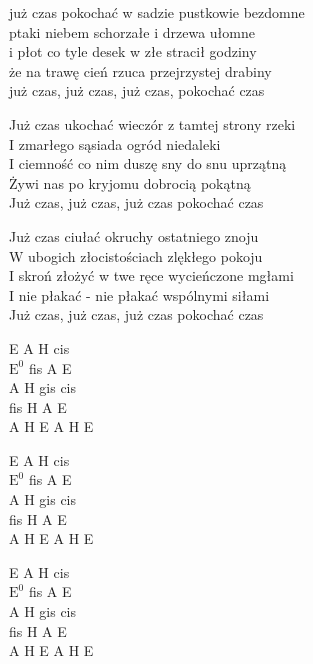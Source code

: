 \begin{textn}
    już czas pokochać w sadzie pustkowie bezdomne\\
    ptaki niebem schorzałe i drzewa ułomne\\
    i płot co tyle desek w złe stracił godziny\\
    że na trawę cień rzuca przejrzystej drabiny\\
    już czas, już czas, już czas, pokochać czas

    Już czas ukochać wieczór z tamtej strony rzeki\\
    I zmarłego sąsiada ogród niedaleki\\
    I ciemność co nim duszę sny do snu uprzątną\\
    Żywi nas po kryjomu dobrocią pokątną\\
    Już czas, już czas, już czas pokochać czas

    Już czas ciułać okruchy ostatniego znoju\\
    W ubogich złocistościach zlękłego pokoju\\
    I skroń złożyć w twe ręce wycieńczone mgłami\\
    I nie płakać - nie płakać wspólnymi siłami\\
    Już czas, już czas, już czas pokochać czas
\end{textn}
\begin{chordw}
    E A H cis\\
    $\mathrm{E^{0}}$ fis A E\\
    A H gis cis\\
    fis H A E\\
    A H E A H E

    E A H cis\\
    $\mathrm{E^{0}}$ fis A E\\
    A H gis cis\\
    fis H A E\\
    A H E A H E

    E A H cis\\
    $\mathrm{E^{0}}$ fis A E\\
    A H gis cis\\
    fis H A E\\
    A H E A H E

\end{chordw}
